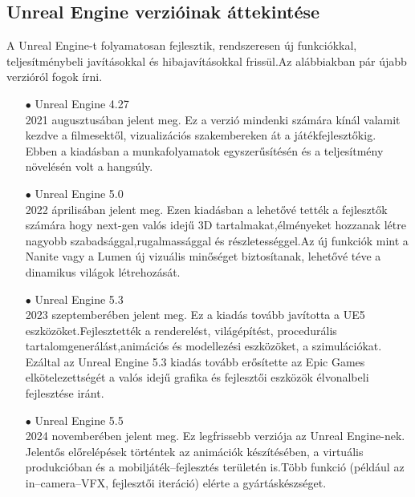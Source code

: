 \documentclass[
]{thesis-ekf}
\theoremstyle{definition}
\theoremstyle{remark}
\begin{document}
\subsection{Unreal Engine verzióinak áttekintése}
A Unreal Engine-t folyamatosan fejlesztik, rendszeresen új funkciókkal, teljesítménybeli javításokkal és hibajavításokkal frissül.Az alábbiakban pár újabb verzióról fogok írni.
\begin{itemize}
	\item[$\bullet$]Unreal Engine 4.27 \\ 2021 augusztusában jelent meg. Ez a verzió mindenki számára kínál valamit kezdve a filmesektől, vizualizációs szakembereken át a játékfejlesztőkig. Ebben a kiadásban a munkafolyamatok egyszerűsítésén és a teljesítmény növelésén volt a hangsúly.\cite{Unreal4.27}
	\item[$\bullet$]Unreal Engine 5.0 \\ 2022 áprilisában jelent meg. Ezen kiadásban a lehetővé tették a fejlesztők számára hogy next-gen valós idejű 3D tartalmakat,élményeket hozzanak létre nagyobb szabadsággal,rugalmassággal és részletességgel.Az új funkciók mint a Nanite vagy a Lumen új vizuális minőséget biztosítanak, lehetővé téve a dinamikus világok létrehozását.\cite{Unreal5.0}
	\item[$\bullet$]Unreal Engine 5.3 \\ 2023 szeptemberében jelent meg. Ez a kiadás tovább javította a UE5 eszközöket.Fejlesztették a renderelést, világépítést, procedurális tartalomgenerálást,animációs és modellezési eszközöket, a szimulációkat. Ezáltal az Unreal Engine 5.3 kiadás tovább erősítette az Epic Games elkötelezettségét a valós idejű grafika és fejlesztői eszközök élvonalbeli fejlesztése iránt.\cite{Unreal5.3}
	\item[$\bullet$]Unreal Engine 5.5 \\ 2024 novemberében jelent meg. Ez legfrissebb verziója az Unreal Engine-nek. Jelentős előrelépések történtek az animációk készítésében, a virtuális produkcióban és a mobiljáték--fejlesztés területén is.Több funkció (például az in--camera--VFX, fejlesztői iteráció) elérte a gyártáskészséget. \cite{Unreal5.5}
\end{itemize}
\end{document}
